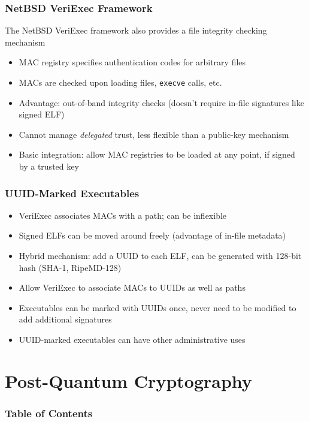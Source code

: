 \documentclass{beamer}
\begin{document}
\begin{frame}
  \frametitle{NetBSD VeriExec Framework}

  The NetBSD VeriExec framework also provides a file integrity
  checking mechanism
  \begin{itemize}
  \item MAC registry specifies authentication codes for arbitrary files
  \item MACs are checked upon loading files, \texttt{execve} calls, etc.
  \item Advantage: out-of-band integrity checks (doesn't require
    in-file signatures like signed ELF)
  \item Cannot manage \emph{delegated} trust, less flexible than a
    public-key mechanism
  \item Basic integration: allow MAC registries to be loaded at any
    point, if signed by a trusted key
  \end{itemize}
\end{frame}

\begin{frame}
  \frametitle{UUID-Marked Executables}
  \begin{itemize}
  \item VeriExec associates MACs with a path; can be inflexible
  \item Signed ELFs can be moved around freely (advantage of in-file
    metadata)
  \item Hybrid mechanism: add a UUID to each ELF, can be generated
    with 128-bit hash (SHA-1, RipeMD-128)
  \item Allow VeriExec to associate MACs to UUIDs as well as paths
  \item Executables can be marked with UUIDs once, never need to be
    modified to add additional signatures
  \item UUID-marked executables can have other administrative uses
  \end{itemize}
\end{frame}

\section{Post-Quantum Cryptography}

\begin{frame}
  \frametitle{Table of Contents}
  \tableofcontents[currentsection]
\end{frame}
\end{document}
